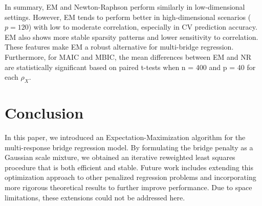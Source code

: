 \documentclass[twoside]{article}
\begin{document}
In summary, EM and Newton-Raphson perform similarly in low-dimensional settings. However, EM tends to perform better in high-dimensional scenarios ($p=120$) with low to moderate correlation, especially in CV prediction accuracy. EM also shows more stable sparsity patterns and lower sensitivity to correlation. These features make EM a robust alternative for multi-bridge regression. Furthermore, for MAIC and MBIC, the mean differences between EM and NR are statistically significant based on paired t-tests when n = 400 and p = 40 for each $\rho_X$. 



\section*{Conclusion}
 In this paper, we introduced an Expectation-Maximization algorithm for the multi-response bridge regression model. By formulating the bridge penalty as a Gaussian scale mixture, we obtained an iterative reweighted least squares procedure that is both efficient and stable. Future work includes extending this optimization approach to other penalized regression problems and incorporating more rigorous theoretical results to further improve performance. Due to space limitations, these extensions could not be addressed here.
\end{document}
